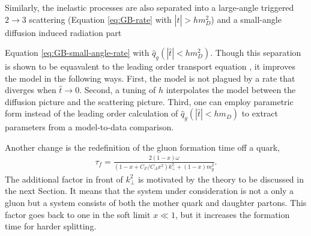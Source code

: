 \documentclass[aps, prc, reprint, amsmath, groupedaddress, nofootinbib]{revtex4-1}
\begin{document}
Similarly, the inelastic processes are also separated into a large-angle triggered $2\rightarrow 3$ scattering (Equation \ref{eq:GB-rate} with $|\hat{t}| > h m_D^2$) and a small-angle diffusion induced radiation part {Equation \ref{eq:GB-small-angle-rate} with $\hat{q}_g(|\hat{t}|<h m_D^2)$.  
Though this separation is shown to be equavalent to the leading order transport equation \cite{Ghiglieri:2015ala}, it improves the model in the following ways.
First, the model is not plagued by a rate that diverges when $\hat{t} \rightarrow 0$.
Second, a tuning of $h$ interpolates the model between the diffusion picture and the scattering picture. 
Third, one can employ parametric form instead of the leading order calculation of $\hat{q}_g(|\hat{t}|<hm_D)$ to extract parameters from a model-to-data comparison.

Another change is the redefinition of the gluon formation time off a quark,
\begin{eqnarray}\label{eq:formation-time-def}
\tau_f = \frac{2(1-x)\omega}{\left(1-x+C_F/C_A x^2\right)k_\perp^2 + (1-x)m_g^2}.
\end{eqnarray}
The additional factor in front of $k_\perp^2$ is motivated by the theory to be discussed in the next Section.
It means that the system under consideration is not a only a gluon but a system consists of both the mother quark and daughter partons. 
This factor goes back to one in the soft limit $x\ll 1$, but it increases the formation time for harder splitting. 

}
\end{document}
